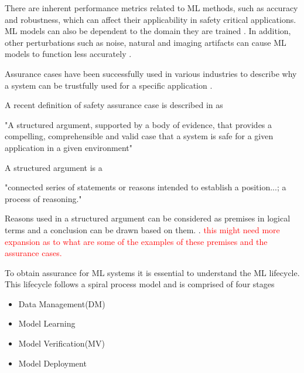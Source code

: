 
There are inherent performance metrics related to ML methods, such as accuracy and robustness, which can affect their applicability in safety critical applications. ML models can also be dependent to the domain they are trained \cite{Ganin2015}. In addition, other perturbations such as noise, natural and imaging artifacts can cause ML models to function less accurately \cite{Hendrycks2019}.

Assurance cases have been successfully used in various industries to describe why a system can be trustfully used for a specific application \cite{Ashmore2021}.

A recent definition of safety assurance case is described in \cite{Bloomfield2010} as


\begin{displayquote}[][]
"A structured argument, supported by a body of evidence, that provides a compelling, comprehensible and valid case that a system is safe for a given application in a given environment"
\end{displayquote}


A structured argument is a \cite{Omg2010}
\begin{displayquote}[][]
"connected series of statements or reasons intended to establish a position...; a process of reasoning."
\end{displayquote}

Reasons used in a structured argument can be considered as premises in logical terms and a conclusion can be drawn based on them. \cite{Omg2010}.  \textcolor{red}{this might need more expansion as to what are some of the examples of these premises and the assurance cases.}

To obtain assurance for ML systems it is essential to understand the ML lifecycle. This lifecycle follows a spiral process model\cite{Boehm2000} and is comprised of four stages \cite{Ashmore2021} 
\begin{itemize}
    \item Data Management(DM)
    \item Model Learning
    \item Model Verification(MV)
    \item Model Deployment
\end{itemize}
